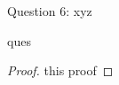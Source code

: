 \begin{solution}{Question 6: xyz}\label{ques:6}
    \begin{question}
    ques
    \end{question}
    \tcblower{}
    \begin{proof}
    this proof
    \end{proof}
\end{solution}
